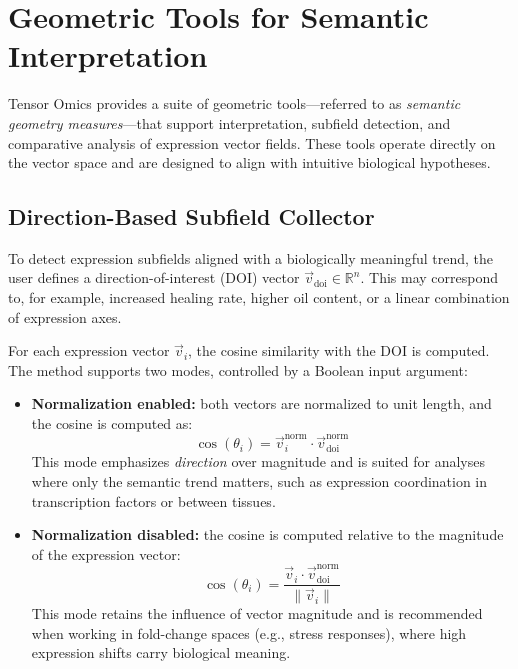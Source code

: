 \section{Geometric Tools for Semantic Interpretation}\label{sec:geometric_tools}

    Tensor Omics provides a suite of geometric tools—referred to as \textit{semantic geometry measures}—that support interpretation, subfield detection, and comparative analysis of expression vector fields. These tools operate directly on the vector space and are designed to align with intuitive biological hypotheses.

    \subsection{Direction-Based Subfield Collector}\label{sec:directional_collector}

        To detect expression subfields aligned with a biologically meaningful trend, the user defines a direction-of-interest (DOI) vector \( \vec{v}_{\text{doi}} \in \mathbb{R}^n \). This may correspond to, for example, increased healing rate, higher oil content, or a linear combination of expression axes.

        For each expression vector \( \vec{v}_i \), the cosine similarity with the DOI is computed. The method supports two modes, controlled by a Boolean input argument:

        \begin{itemize}
            \item \textbf{Normalization enabled:} both vectors are normalized to unit length, and the cosine is computed as:
                  \[
                      \cos(\theta_i) = \vec{v}_i^{\text{norm}} \cdot \vec{v}_{\text{doi}}^{\text{norm}}
                  \]
                  This mode emphasizes \emph{direction} over magnitude and is suited for analyses where only the semantic trend matters, such as expression coordination in transcription factors or between tissues.

            \item \textbf{Normalization disabled:} the cosine is computed relative to the magnitude of the expression vector:
                  \[
                      \cos(\theta_i) = \frac{\vec{v}_i \cdot \vec{v}_{\text{doi}}^{\text{norm}}}{\|\vec{v}_i\|}
                  \]
                  This mode retains the influence of vector magnitude and is recommended when working in fold-change spaces (e.g., stress responses), where high expression shifts carry biological meaning.
        \end{itemize}

